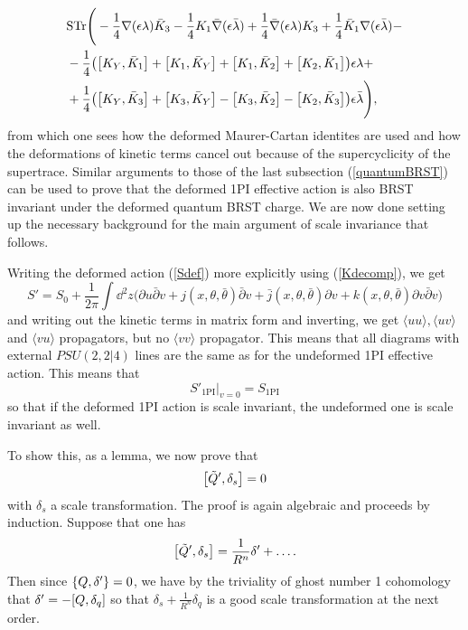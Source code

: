 \documentclass[12pt]{article}
\def\be{\begin{equation}}
\def\ee{\end{equation}}
\numberwithin{equation}{section}
\begin{document}
{\begin{align}
											  &	\text{STr}\Biggr(-\frac{1}{4}\nabla(\epsilon \lambda) \bar{K}_3 - \frac{1}{4} K_1 \bar{\nabla}(\epsilon \bar{\lambda}) + \frac{1}{4}\bar{\nabla}(\epsilon \lambda)K_3 + \frac{1}{4} \bar{K}_1 \nabla(\epsilon \bar{\lambda}) - \nonumber \\
	 &-\frac{1}{4} \big(\comm{K_Y}{\bar{K}_1} + \comm{K_1}{\bar{K}_Y}+\comm{K_1}{\bar{K}_2} + \comm{K_2}{\bar{K}_1}\big)\epsilon \lambda + \nonumber \\
	 &+\frac{1}{4}\big(\comm{K_Y}{\bar{K}_3} + \comm{K_3}{\bar{K}_Y} - \comm{K_3}{\bar{K}_2} - \comm{K_2}{\bar{K}_3}\big)\epsilon \bar{\lambda}\Biggr),
\end{align}
from which one sees how the deformed Maurer-Cartan identites are used and how the deformations of kinetic terms cancel out because of the supercyclicity of the supertrace. Similar arguments to those of the last subsection (\ref{quantumBRST}) can be used to prove that the deformed 1PI effective action is also BRST invariant under the deformed quantum BRST charge.} We are now done setting up the necessary background for the main argument of scale invariance that follows.

Writing the deformed action (\ref{Sdef}) more explicitly using (\ref{Kdecomp}), we get
\be
S' = S_0 + \frac{1}{2\pi} \int \dd^2 z \big(\partial u \bar{\partial} v + j(x, \theta, \bar{\theta}) \bar{\partial} v + \bar{j}(x,\theta,\bar{\theta})\partial v + k(x,\theta,\bar{\theta})\partial v \bar{\partial} v\big)
\ee
and writing out the kinetic terms in matrix form and inverting, we get $\langle u u\rangle, \langle u v\rangle$ and $\langle v u \rangle$ propagators, but no $\langle v v \rangle$ propagator. This means that all diagrams with external $PSU(2,2|4)$ lines are the same as for the undeformed 1PI effective action. This means that
\be
\label{ezrels}
S'_{\text{1PI}}\rvert_{v=0} = S_{\text{1PI}}
\ee
so that if the deformed 1PI action is scale invariant, the undeformed one is scale invariant as well.

To show this, as a lemma, we now prove that
\be
\comm{\tilde{Q}'}{\delta_s} = 0
\ee
with $\delta_s$ a scale transformation. The proof is again algebraic and proceeds by induction. Suppose that one has
\be
\comm{\tilde{Q}'}{\delta_s} = \frac{1}{R^n} \delta' + \ldots.
\ee Then since $\acomm{Q}{\delta'} = 0$, we have by the triviality of ghost number 1 cohomology that $\delta' = -\comm{Q}{\delta_q}$ so that $\delta_s + \frac{1}{R^n} \delta_q$ is a good scale transformation at the next order.
\end{document}
